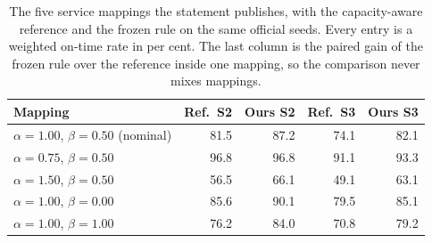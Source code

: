 \begin{table}[htbp]
\centering
\caption{The five service mappings the statement publishes, with the capacity-aware reference and the frozen rule on the same \slotNSeeds{} official seeds. Every entry is a weighted on-time rate in per cent. The last column is the paired gain of the frozen rule over the reference inside one mapping, so the comparison never mixes mappings.}
\label{tab:maps}
\scriptsize
\setlength{\tabcolsep}{4.0pt}
\begin{tabular}{lrrrr}
\toprule
Mapping & Ref.\ S2 & Ours S2 & Ref.\ S3 & Ours S3 \\
\midrule
$\alpha=1.00$, $\beta=0.50$ (nominal) & 81.5 & 87.2 & 74.1 & 82.1 \\
$\alpha=0.75$, $\beta=0.50$ & 96.8 & 96.8 & 91.1 & 93.3 \\
$\alpha=1.50$, $\beta=0.50$ & 56.5 & 66.1 & 49.1 & 63.1 \\
$\alpha=1.00$, $\beta=0.00$ & 85.6 & 90.1 & 79.5 & 85.1 \\
$\alpha=1.00$, $\beta=1.00$ & 76.2 & 84.0 & 70.8 & 79.2 \\
\bottomrule
\end{tabular}
\end{table}
